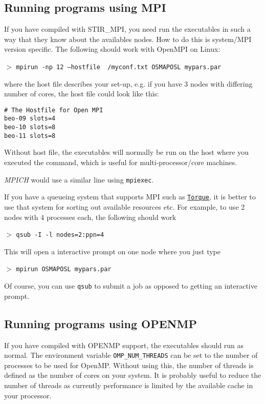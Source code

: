 \documentclass{article}
\def\url#1#2{\mbox{\href{#1}{\tt #2}}}
\newcommand{\cmdline}[1]{\par \noindent $>$ \texttt{#1}\par}
\begin{document}
\subsection{
Running programs using MPI \label{sec:RunningWithMPI}}
If you have compiled with STIR\_MPI, you need run the executables in such a way that
they know about the availables nodes. How to do this is system/MPI version specific. The following
should work with OpenMPI on Linux:

\cmdline{mpirun -np 12 --hostfile ~/myconf.txt OSMAPOSL mypars.par}

\noindent 
where the host file describes your set-up, e.g. if you have 3 nodes with differing number of cores, the
host file could look like this:
\begin{verbatim}
# The Hostfile for Open MPI
beo-09 slots=4
beo-10 slots=8
beo-11 slots=8
\end{verbatim}
Without host file, the executables will normally be run on the host where you executed the command, which
is useful for multi-processor/core machines. 

\textit{MPICH} would use a similar line using \texttt{mpiexec}.

If you have a queueing system that supports MPI such as 
\url{http://www.clusterresources.com/products/torque-resource-manager.php}{Torque}, it is better to use 
that system for sorting out available resources etc. For example, to use 2 nodes with 4 processes each,
the following should work

\cmdline{qsub -I -l nodes=2:ppn=4}

This will open a interactive prompt on one node where you just type

\cmdline{mpirun OSMAPOSL mypars.par}

Of course, you can use \texttt{qsub} to submit a job as opposed to getting an interactive prompt.

\subsection{
Running programs using OPENMP \label{sec:RunningWithOPENMP}}
If you have compiled with OPENMP support, the executables should run as normal.
The environment variable \texttt{OMP\_NUM\_THREADS} can be set to the number of processes to be used for OpenMP. 
Without using this, the number of threads is  defined as the number of cores on your system. It is probably 
useful to reduce the number of threads as currently performance is limited by the available cache in your 
processor.
\end{document}
